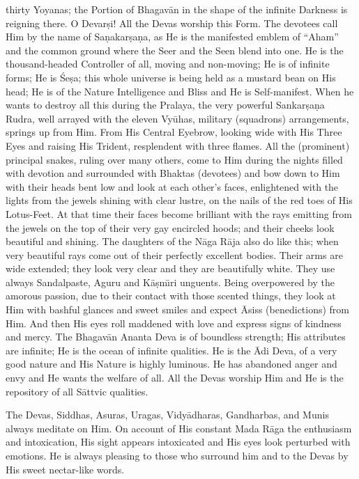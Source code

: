thirty Yoyanas; the Portion of Bhagav\=an in the shape of the infinite Darkness is reigning there. O Devar\d{s}i! All the Devas worship this Form. The devotees call Him by the name of Sa\d{n}akar\d{s}a\d{n}a, as He is the manifested emblem of ``Aham'' and the common ground where the Seer and the Seen blend into one. He is the thousand-headed Controller of all, moving and non-moving; He is of infinite forms; He is \'Se\d{s}a; this whole universe is being held as a mustard bean on His head; He is of the Nature Intelligence and Bliss and He is Self-manifest. When he wants to destroy all this during the Pralaya, the very powerful Sankar\d{s}a\d{n}a Rudra, well arrayed with the eleven Vy\=uhas, military (squadrons) arrangements, springs up from Him. From His Central Eyebrow, looking wide with His Three Eyes and raising His Trident, resplendent with three flames. All the (prominent) principal snakes, ruling over many others, come to Him during the nights filled with devotion and surrounded with Bhaktas (devotees) and bow down to Him with their heads bent low and look at each other's faces, enlightened with the lights from the jewels shining with clear lustre, on the nails of the red toes of His Lotus-Feet. At that time their faces become brilliant with the rays emitting from the jewels on the top of their very gay encircled hoods; and their cheeks look beautiful and shining. The daughters of the N\=aga R\=aja also do like this; when very beautiful rays come out of their perfectly excellent bodies. Their arms are wide extended; they look very clear and they are beautifully white. They use always Sandalpaste, Aguru and K\=a\d{s}m\={\i}ri unguents. Being overpowered by the amorous passion, due to their contact with those scented things, they look at Him with bashful glances and sweet smiles and expect \=Asiss (benedictions) from Him. And then His eyes roll maddened with love and express signs of kindness and mercy. The Bhagav\=an Ananta Deva is of boundless strength; His attributes are infinite; He is the ocean of infinite qualities. He is the \=Adi Deva, of a very good nature and His Nature is highly luminous. He has abandoned anger and envy and He wants the welfare of all. All the Devas worship Him and He is the repository of all S\=attvic qualities.

The Devas, Siddhas, Asuras, Uragas, Vidy\=adharas, Gandharbas, and Munis always meditate on Him. On account of His constant Mada R\=aga the enthusiasm and intoxication, His sight appears intoxicated and His eyes look perturbed with emotions. He is always pleasing to those who surround him and to the Devas by His sweet nectar-like words.

